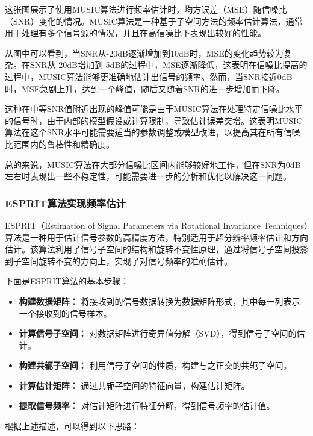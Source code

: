 \documentclass[a4paper,12pt]{article}
\begin{document}
这张图展示了使用MUSIC算法进行频率估计时，均方误差（MSE）随信噪比（SNR）变化的情况。MUSIC算法是一种基于子空间方法的频率估计算法，通常用于处理有多个信号源的情况，并且在高信噪比下表现出较好的性能。

从图中可以看到，当SNR从-20dB逐渐增加到10dB时，MSE的变化趋势较为复杂。在SNR从-20dB增加到-5dB的过程中，MSE逐渐降低，这表明在信噪比提高的过程中，MUSIC算法能够更准确地估计出信号的频率。然而，当SNR接近0dB时，MSE急剧上升，达到一个峰值，随后又随着SNR的进一步增加而下降。

这种在中等SNR值附近出现的峰值可能是由于MUSIC算法在处理特定信噪比水平的信号时，由于内部的模型假设或计算限制，导致估计误差突增。这表明MUSIC算法在这个SNR水平可能需要适当的参数调整或模型改进，以提高其在所有信噪比范围内的鲁棒性和精确度。

总的来说，MUSIC算法在大部分信噪比区间内能够较好地工作，但在SNR为0dB左右时表现出一些不稳定性，可能需要进一步的分析和优化以解决这一问题。

\subsubsection{ESPRIT算法实现频率估计}
ESPRIT（Estimation of Signal Parameters via Rotational Invariance Techniques）算法是一种用于估计信号参数的高精度方法，特别适用于超分辨率频率估计和方向估计。该算法利用了信号子空间的结构和旋转不变性原理，通过将信号子空间投影到子空间旋转不变的方向上，实现了对信号频率的准确估计。\cite{roy1989esprit}

下面是ESPRIT算法的基本步骤：

\begin{itemize}
    \item \textbf{构建数据矩阵：} 将接收到的信号数据转换为数据矩阵形式，其中每一列表示一个接收到的信号样本。
    
    \item \textbf{计算信号子空间：} 对数据矩阵进行奇异值分解（SVD），得到信号子空间的估计。
    
    \item \textbf{构建共轭子空间：} 利用信号子空间的性质，构建与之正交的共轭子空间。
    
    \item \textbf{计算估计矩阵：} 通过共轭子空间的特征向量，构建估计矩阵。
    
    \item \textbf{提取信号频率：} 对估计矩阵进行特征分解，得到信号频率的估计值。
\end{itemize}


根据上述描述，可以得到以下思路：
\end{document}
